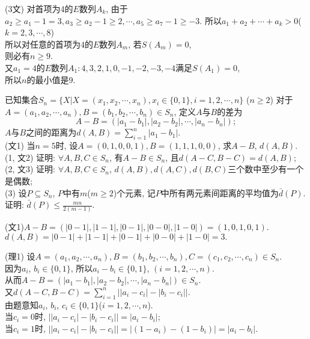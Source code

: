 \documentclass[green]{lsbook}
\begin{document}
(3文) 对首项为4的$E$数列$A_k$, 由于$a_2 \geq a_1-1=3,
a_3\geq a_2 -1\geq 2,
\cdots,
a_5\geq a_7-1\geq -3$.
所以$a_1+a_2 +\cdots +a_k>0$($k=2,3,\cdots,8$)\\
所以对任意的首项为$4$的$E$数列$A_m$, 若$S(A_m)=0$,\\
则必有$n\geq 9$.\\
又$a_1=4$的$E$数列$A_1\colon 4,3,2,1,0,-1,-2,-3,-4$满足$S(A_1)=0$,\\
所以$n$的最小值是$9$.
\newpage


\begin{tcolorbox}[applelight,title={2010.20(本小题13分)}]
	已知集合$S_n=\{X | X = (x_1, x_2,\cdots,x_n), x_i\in \{0,1\}, i=1,2, \cdots, n\}$ ($n\geq 2$) 对于$A=(a_1, a_2, \cdots, a_n),B=(b_1, b_2, \cdots, b_n)\in S_n$, 定义$A$与$B$的差为
	\[A-B=(|a_1-b_1|,|a_2-b_2|,\cdots,|a_n-b_n|);\]
$A$与$B$之间的距离为$d(A, B)=\sum_{i=1}^{n}|a_1-b_1|$.\\
(文1) 当$n=5$时, 设$A=(0,1,0,0,1), B=(1,1,1,0,0)$, 求$A-B$, $d(A,B)$.\\
(1, 文2) 证明: $\forall A, B, C\in S_n$, 有$A-B\in S_n$, 且$d(A-C, B-C) =d(A, B)$;\\
(2, 文3) 证明: $\forall A, B, C\in S_n$, $d(A, B), d(A, C), d(B, C)$三个数中至少有一个是偶数;\\
(3) 设$P\subseteq S_n$, $P$中有$m$($m\geq 2$)个元素, 记$P$中所有两元素间距离的平均值为$\bar{d}(P)$. 证明: $\bar{d}(P)\leq \frac{mn}{2(m-1)}$.
\end{tcolorbox}


(文1)$A-B=(|0-1|,|1-1|,|0-1|,|0-0|,|1-0|)=(1,0,1,0,1).$\\
         $d(A,B)=|0-1|+|1-1|+|0-1|+|0-0|+|1-0|=3.$

(理1) 设$A=(a_1, a_2, \cdots, a_n), B=(b_1, b_2, \cdots, b_n), C=(c_1,c_2,\cdots,c_n)\in S_n$.\\
      因为$a_i$, $b_i\in \{0,1\}$, 所以$a_i-b_i\in \{0,1\}$, $(i=1,2,\cdots,n)$.\\
      从而$A-B=(|a_1-b_1|,|a_2-b_2|,\cdots,|a_n-b_n|)\in S_n$.\\
     又$d(A-C, B-C)=\sum_{i=1}^{n} \left| |a_i-c_i|-|b_i-c_i| \right|$.\\
由题意知$a_i$, $b_i$, $c_i\in \{0,1\}$($i=1,2,\cdots,n$).\\
当$c_i=0$时, $\left||a_i-c_i|-|b_i-c_i|\right|=|a_i-b_i|$;\\
当$c_i=1$时, $\left||a_i-c_i|-|b_i-c_i|\right|=|(1-a_i)-(1-b_i)|=|a_i-b_i|$.
\end{document}
